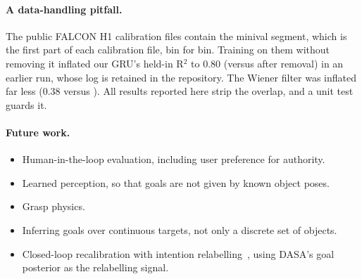\paragraph{A data-handling pitfall.} The public FALCON H1 calibration files contain the minival segment, which is the first part of each calibration file, bin for bin. Training on them without removing it inflated our GRU's held-in R$^2$ to 0.80 (versus \GRUWithin{} after removal) in an earlier run, whose log is retained in the repository. The Wiener filter was inflated far less (0.38 versus \WienerWithin). All results reported here strip the overlap, and a unit test guards it.

\paragraph{Future work.}
\begin{itemize}
\item Human-in-the-loop evaluation, including user preference for authority.
\item Learned perception, so that goals are not given by known object poses.
\item Grasp physics.
\item Inferring goals over continuous targets, not only a discrete set of objects.
\item Closed-loop recalibration with intention relabelling~\cite{gilja2012high,wilson2025longterm}, using DASA's goal posterior as the relabelling signal.
\end{itemize}
